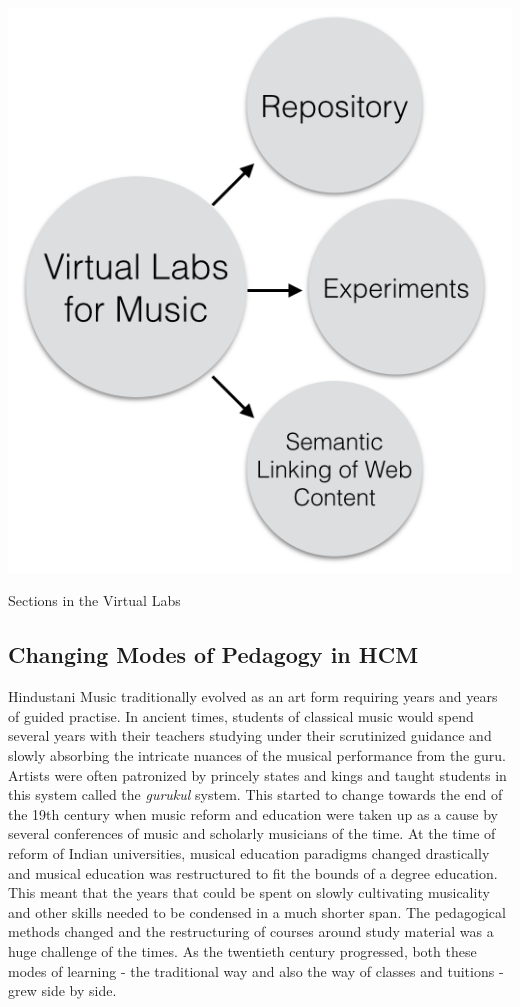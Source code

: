 \documentclass{tufte-handout}
\begin{document}
\begin{marginfigure}%
  \includegraphics[width=\linewidth]{fig1.png}
  \caption{Sections in the Virtual Labs}
  \label{fig:marginfig}
\end{marginfigure}

\subsection{Changing Modes of Pedagogy in HCM}\label{sec:pedagogy}
Hindustani Music traditionally evolved as an art form requiring years and years of guided practise. In ancient times, students of classical music would spend several years with their teachers studying under their scrutinized guidance and slowly absorbing the intricate nuances of the musical performance from the guru. \cite{neuman} Artists were often patronized by princely states and kings and taught students in this system called the \textit{gurukul} system. This started to change towards the end of the 19th century when music reform and education were taken up as a cause by several conferences of music and scholarly musicians of the time.\cite{mansions} At the time of reform of Indian universities, musical education paradigms changed drastically and musical education was restructured to fit the bounds of a degree education. This meant that the years that could be spent on slowly cultivating musicality and other skills needed to be condensed in a much shorter span. The pedagogical methods changed and the restructuring of courses around study material was a huge challenge of the times. As the twentieth century progressed, both these modes of learning - the traditional way and also the way of classes and tuitions - grew side by side.
\end{document}
